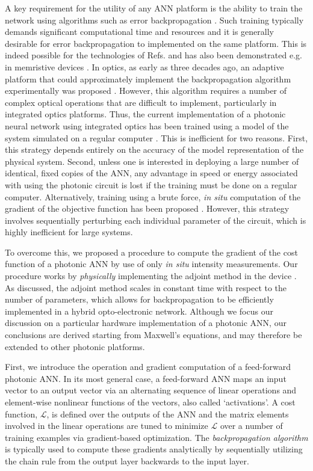 A key requirement for the utility of any ANN platform is the ability to train the network using algorithms such as error backpropagation \cite{Rumelhart1986}. Such training typically demands significant computational time and resources and it is generally desirable for error backpropagation to implemented on the same platform. This is indeed possible for the technologies of Refs. \cite{Merolla2014, Graves2016, hermans2015trainable} and has also been demonstrated e.g. in memristive devices \cite{alibart2013pattern, Prezioso2015}. In optics, as early as three decades ago, an adaptive platform that could approximately implement the backpropagation algorithm experimentally was proposed \cite{wagner1987multilayer,psaltis1988adaptive}. However, this algorithm requires a number of complex optical operations that are difficult to implement, particularly in integrated optics platforms. Thus, the current implementation of a photonic neural network using integrated optics has been trained using a model of the system simulated on a regular computer \cite{Shen2017}. This is inefficient for two reasons. First, this strategy depends entirely on the accuracy of the model representation of the physical system. Second, unless one is interested in deploying a large number of identical, fixed copies of the ANN, any advantage in speed or energy associated with using the photonic circuit is lost if the training must be done on a regular computer.  Alternatively, training using a brute force, \textit{in situ} computation of the gradient of the objective function has been proposed \cite{Shen2017}. However, this strategy involves sequentially perturbing each individual parameter of the circuit, which is highly inefficient for large systems.

To overcome this, we proposed \cite{hughes2018training} a procedure to compute the gradient of the cost function of a photonic ANN by use of only \textit{in situ} intensity measurements.    Our procedure works by \textit{physically} implementing the adjoint method in the device \cite{Georgieva2002, Veronis2004, hughes_method_2017}.  As discussed, the adjoint method scales in constant time with respect to the number of parameters, which allows for backpropagation to be efficiently implemented in a hybrid opto-electronic network.  Although we focus our discussion on a particular hardware implementation of a photonic ANN, our conclusions are derived starting from Maxwell’s equations, and may therefore be extended to other photonic platforms.

First, we introduce the operation and gradient computation of a feed-forward photonic ANN.  In its most general case, a feed-forward ANN maps an input vector to an output vector via an alternating sequence of linear operations and element-wise nonlinear functions of the vectors, also called `activations'.  A cost function, $\mathcal{L}$, is defined over the outputs of the ANN and the matrix elements involved in the linear operations are tuned to minimize $\mathcal{L}$ over a number of training examples via gradient-based optimization.  The \textit{backpropagation algorithm} is typically used to compute these gradients analytically by sequentially utilizing the chain rule from the output layer backwards to the input layer.

